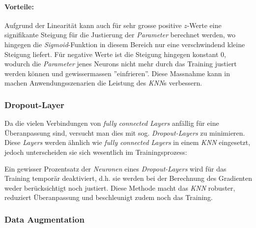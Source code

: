 \paragraph{Vorteile:} Aufgrund der Linearität kann auch für sehr grosse positive $z$-Werte eine signifikante Steigung für die Justierung der \textit{Parameter} berechnet werden, wo hingegen die \textit{Sigmoid}-Funktion in diesem Bereich nur eine verschwindend kleine Steigung liefert. Für negative Werte ist die Steigung hingegen konstant 0, wodurch die \textit{Parameter} jenes Neurons nicht mehr durch das Training justiert werden können und gewissermassen ''einfrieren''. Diese Massnahme kann in machen Anwendungsszenarien die Leistung des \textit{KNN}s verbessern.

%
%

\subsubsection{Dropout-Layer}
Da die vielen Verbindungen von \textit{fully connected Layers} anfällig für eine Überanpassung sind, versucht man dies mit sog. \textit{Dropout-Layers} zu minimieren. Diese \textit{Layers} werden ähnlich wie \textit{fully connected Layers} in einem \textit{KNN} eingesetzt, jedoch unterscheiden sie sich wesentlich im Trainingsprozess:

Ein gewisser Prozentsatz der \textit{Neuronen} eines \textit{Dropout-Layers} wird für das Training temporär deaktiviert, d.h. sie werden bei der Berechnung des Gradienten weder berücksichtigt noch justiert. Diese Methode macht das \textit{KNN} robuster, reduziert Überanpassung und beschleunigt zudem noch das Training.

\subsubsection{Data Augmentation}

